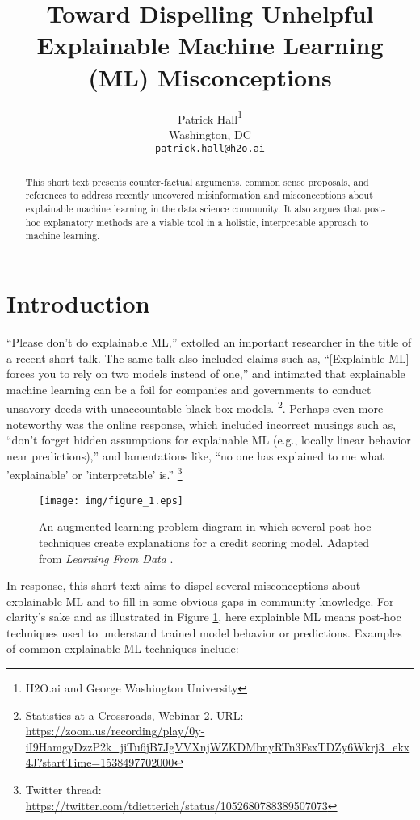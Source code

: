 \documentclass{article}
\title{Toward Dispelling Unhelpful Explainable Machine Learning (ML) Misconceptions}
\author{
  Patrick Hall\thanks{H2O.ai and George Washington University}\\
  Washington, DC\\
  \texttt{patrick.hall@h2o.ai}}
\begin{document}
\maketitle

\begin{abstract}

This short text presents counter-factual arguments, common sense proposals, and references to address recently uncovered misinformation and misconceptions about explainable machine learning in the data science community. It also argues that post-hoc explanatory methods are a viable tool in a holistic, interpretable approach to machine learning.

\end{abstract}

\section{Introduction}

``Please don't do explainable ML,'' extolled an important researcher in the title of a recent short talk. The same talk also included claims such as, ``[Explainble ML] forces you to rely on two models instead of one,'' and intimated that explainable machine learning can be a foil for companies and governments to conduct unsavory deeds with unaccountable black-box models. \footnote{Statistics at a Crossroads, Webinar 2. URL: \url{https://zoom.us/recording/play/0y-iI9HamgyDzzP2k_jiTu6jB7JgVVXnjWZKDMbnyRTn3FsxTDZy6Wkrj3_ekx4J?startTime=1538497702000}}. Perhaps even more noteworthy was the online response, which included incorrect musings such as, ``don’t forget hidden assumptions for explainable ML (e.g., locally linear behavior near predictions),'' and lamentations like, ``no one has explained to me what 'explainable' or 'interpretable' is.'' \footnote{Twitter thread: \url{https://twitter.com/tdietterich/status/1052680788389507073}}  

\begin{figure}[htb]
	\begin{center}
		\texttt{[image: img/figure\_1.eps]}
		\label{fig:learning_problem}
		\caption{An augmented learning problem diagram in which several post-hoc techniques create explanations for a credit scoring model. Adapted from \textit{Learning From Data} \cite{lfd}.}
	\end{center}
\end{figure}	

In response, this short text aims to dispel several misconceptions about explainable ML and to fill in some obvious gaps in community knowledge. For clarity's sake and as illustrated in Figure \ref{fig:learning_problem}, here explainble ML means post-hoc techniques used to understand trained model behavior or predictions. Examples of common explainable ML techniques include:
\end{document}
